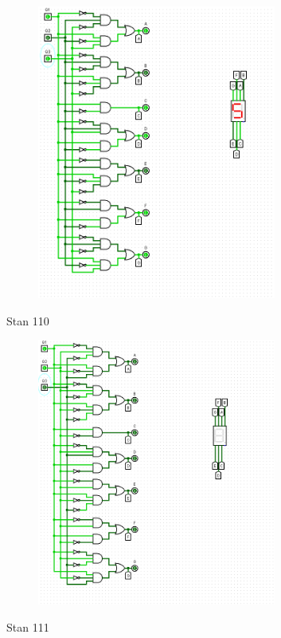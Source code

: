 \documentclass[]{article}
\begin{document}
\begin{figure}[H]
	\centering
	\includegraphics[width=0.7\textwidth]{TTRZY_101.png}
\end{figure}
\newpage
Stan 110
\begin{figure}[H]
	\centering
	\includegraphics[width=0.7\textwidth]{TTRZY_110.png}
\end{figure}
\newpage
Stan 111
\end{document}
